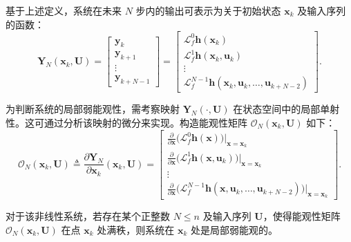 基于上述定义，系统在未来 $N$ 步内的输出可表示为关于初始状态 $\boldsymbol{x}_k$ 及输入序列的函数：
\begin{equation}\label{eq:output_sequence}
    \boldsymbol{Y}_N(\boldsymbol{x}_k, \boldsymbol{U}) = 
    \begin{bmatrix}
        \boldsymbol{y}_k \\ \boldsymbol{y}_{k+1} \\ \vdots \\ \boldsymbol{y}_{k+N-1}
    \end{bmatrix}
    =
    \begin{bmatrix}
        \mathcal{L}_f^0 \boldsymbol{h}(\boldsymbol{x}_k) \\
        \mathcal{L}_f^1 \boldsymbol{h}(\boldsymbol{x}_k, \boldsymbol{u}_k) \\
        \vdots \\
        \mathcal{L}_f^{N-1} \boldsymbol{h}(\boldsymbol{x}_k, \boldsymbol{u}_k, \dots, \boldsymbol{u}_{k+N-2})
    \end{bmatrix}.
\end{equation}

为判断系统的局部弱能观性，需考察映射 $\boldsymbol{Y}_N(\cdot, \boldsymbol{U})$ 在状态空间中的局部单射性。这可通过分析该映射的微分来实现。构造能观性矩阵 $\mathcal{O}_N(\boldsymbol{x}_k, \boldsymbol{U})$ 如下：
\begin{equation}\label{eq:observability_matrix}
\mathcal{O}_N(\boldsymbol{x}_k, \boldsymbol{U}) \triangleq 
\frac{\partial \boldsymbol{Y}_N}{\partial \boldsymbol{x}_k}(\boldsymbol{x}_k, \boldsymbol{U})
= 
\begin{bmatrix}
\displaystyle \frac{\partial}{\partial \boldsymbol{x}}\big( \mathcal{L}_f^0 \boldsymbol{h}(\boldsymbol{x}) \big)\Big|_{\boldsymbol{x}=\boldsymbol{x}_k} \\[10pt]
\displaystyle \frac{\partial}{\partial \boldsymbol{x}}\big( \mathcal{L}_f^1 \boldsymbol{h}(\boldsymbol{x}, \boldsymbol{u}_k) \big)\Big|_{\boldsymbol{x}=\boldsymbol{x}_k} \\[10pt]
\vdots \\[10pt]
\displaystyle \frac{\partial}{\partial \boldsymbol{x}}\big( \mathcal{L}_f^{N-1} \boldsymbol{h}(\boldsymbol{x}, \boldsymbol{u}_k, \dots, \boldsymbol{u}_{k+N-2}) \big)\Big|_{\boldsymbol{x}=\boldsymbol{x}_k}
\end{bmatrix}.
\end{equation}

对于该非线性系统，若存在某个正整数 $N \le n$ 及输入序列 $\boldsymbol{U}$，使得能观性矩阵 $\mathcal{O}_N(\boldsymbol{x}_k, \boldsymbol{U})$ 在点 $\boldsymbol{x}_k$ 处满秩，则系统在 $\boldsymbol{x}_k$ 处是局部弱能观的。


